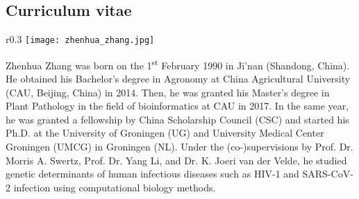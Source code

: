 \documentclass{book}
\begin{document}
\begin{refsection}
\section*{Curriculum vitae}
\begin{wrapfigure}{r}{0.3\textwidth}
  \texttt{[image: zhenhua\_zhang.jpg]}
\end{wrapfigure}
Zhenhua Zhang was born on the 1\textsuperscript{st} February 1990 in Ji'nan (Shandong, China).
He obtained his Bachelor's degree in Agronomy at China Agricultural University (CAU, Beijing, China) in 2014.
Then, he was granted his Master's degree in Plant Pathology in the field of bioinformatics at CAU in 2017.
In the same year, he was granted a fellowship by China Scholarship Council (CSC) and started his Ph.D. at the University of Groningen (UG) and University Medical Center Groningen (UMCG) in Groningen (NL).
Under the (co-)supervisions by Prof. Dr. Morris A. Swertz, Prof. Dr. Yang Li, and Dr. K. Joeri van der Velde, he studied genetic determinants of human infectious diseases such as HIV-1 and SARS-CoV-2 infection using computational biology methods. 

\clearpage
\newpage
{}

\end{refsection}
\end{document}
